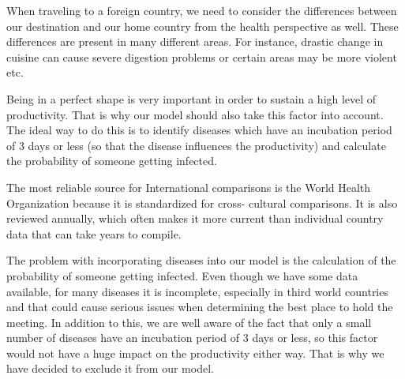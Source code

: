 
When traveling to a foreign country, we need to consider the differences between our destination and our home country from the health perspective as well. These differences are present in many different areas. For instance, drastic change in cuisine can cause severe digestion problems or certain areas may be more violent etc. 

Being in a perfect shape is very important in order to sustain a high level of productivity. That is why our model should also take this factor into account. The ideal way to do this is to identify diseases which have an incubation period of 3 days or less (so that the disease influences the productivity) and calculate the probability of someone getting infected.

The most reliable source for International comparisons is the World Health Organization because it is standardized for cross- cultural comparisons. It is also reviewed annually, which often makes it more current than individual country data that can take years to compile.

The problem with incorporating diseases into our model is the calculation of the probability of someone getting infected. Even though we have some data available, for many diseases it is incomplete, especially in third world countries and that could cause serious issues when determining the best place to hold the meeting. In addition to this, we are well aware of the fact that only a small number of diseases have an incubation period of 3 days or less, so this factor would not have a huge impact on the productivity either way. That is why we have decided to exclude it from our model.
